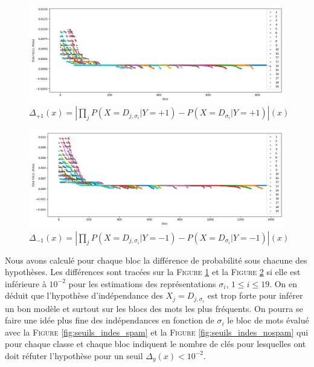 \documentclass[a4paper, french]{article}
\begin{document}
\begin{figure}[h]
\begin{center}
    \caption{%
    $\Delta_{+1}(x)=\left|
    \prod _j P(X=D_{j,\sigma_i}|Y=+1)-P(X=D_{\sigma_i}|Y=+1)\right|(x)$}
    \label{fig:blocs_indes_spam}
    \includegraphics[width=13cm]{blocs_indes_spam}
\end{center}
\end{figure}
\begin{figure}[h]
\begin{center}
    \caption{%
    $\Delta_{-1}(x)=\left|
    \prod _j P(X=D_{j,\sigma_i}|Y=-1)-P(X=D_{\sigma_i}|Y=-1)\right|(x)$}
    \label{fig:blocs_indes_nospam}
    \includegraphics[width=13cm]{blocs_indes_nospam}
\end{center}
\end{figure}

Nous avons calcul\'e pour chaque bloc la diff\'erence de probabilit\'e
sous chacune des hypoth\`eses. Les diff\'erences sont trac\'ees sur la
F\textsc{igure} \ref{fig:blocs_indes_spam} et la F\textsc{igure}
\ref{fig:blocs_indes_nospam} si elle est inf\'erieure \`a $10^{-2}$
pour les estimations des repr\'esentations $\sigma_i$, $1\leq i\leq 19$.
On en d\'eduit que l'hypoth\`ese d'ind\'ependance des $X_j=D_{j,\sigma_i}$
est trop forte pour inf\'erer un bon mod\`ele et surtout sur les blocs des
mots les plus fr\'equents. On pourra se faire une id\'ee plus fine
des ind\'ependances en fonction de $\sigma_i$ le bloc de mots
\'evalu\'e avec la F\textsc{igure} \ref{fig:seuils_indes_spam} et
la F\textsc{igure} \ref{fig:seuils_indes_nospam} qui pour chaque classe
et chaque bloc indiquent le nombre de cl\'es pour lesquelles ont doit
r\'efuter l'hypoth\`ese pour un seuil $\Delta_y(x)<10^{-2}$.
\end{document}
